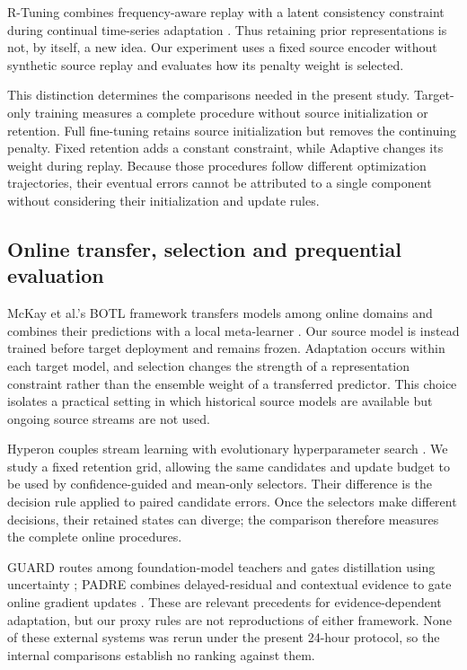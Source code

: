 \documentclass[pdflatex,iicol,sn-mathphys-num]{sn-jnl}
\begin{document}
R-Tuning combines frequency-aware replay with a latent consistency constraint during continual time-series adaptation \cite{rtuning2026}. Thus retaining prior representations is not, by itself, a new idea. Our experiment uses a fixed source encoder without synthetic source replay and evaluates how its penalty weight is selected.

This distinction determines the comparisons needed in the present study. Target-only training measures a complete procedure without source initialization or retention. Full fine-tuning retains source initialization but removes the continuing penalty. Fixed retention adds a constant constraint, while Adaptive changes its weight during replay. Because those procedures follow different optimization trajectories, their eventual errors cannot be attributed to a single component without considering their initialization and update rules.

\subsection{Online transfer, selection and prequential evaluation}
McKay et al.'s BOTL framework transfers models among online domains and combines their predictions with a local meta-learner \cite{botl2020}. Our source model is instead trained before target deployment and remains frozen. Adaptation occurs within each target model, and selection changes the strength of a representation constraint rather than the ensemble weight of a transferred predictor. This choice isolates a practical setting in which historical source models are available but ongoing source streams are not used.

Hyperon couples stream learning with evolutionary hyperparameter search \cite{hyperon2025}. We study a fixed retention grid, allowing the same candidates and update budget to be used by confidence-guided and mean-only selectors. Their difference is the decision rule applied to paired candidate errors. Once the selectors make different decisions, their retained states can diverge; the comparison therefore measures the complete online procedures.

GUARD routes among foundation-model teachers and gates distillation using uncertainty \cite{guard2026}; PADRE combines delayed-residual and contextual evidence to gate online gradient updates \cite{padre2026}. These are relevant precedents for evidence-dependent adaptation, but our proxy rules are not reproductions of either framework. None of these external systems was rerun under the present 24-hour protocol, so the internal comparisons establish no ranking against them.
\end{document}
